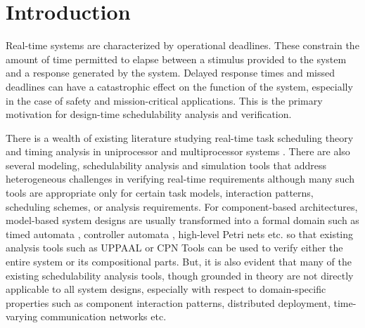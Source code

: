 \section{Introduction}

Real-time systems are characterized by operational deadlines. These constrain the amount of time permitted to elapse between a stimulus provided to the system and a response generated by the system. Delayed response times and missed deadlines can have a catastrophic effect on the function of the system, especially in the case of safety and mission-critical applications. This is the primary motivation for design-time schedulability analysis and verification. 

There is a wealth of existing literature studying real-time task scheduling theory and timing analysis in uniprocessor and multiprocessor systems \cite{Audsley1995, Sha2004}. There are also several modeling, schedulability analysis and simulation tools \cite{MAST1, Cheddar, TIMES, PTIDES} that address heterogeneous challenges in verifying real-time requirements although many such tools are appropriate only for certain task models, interaction patterns, scheduling schemes, or analysis requirements. For component-based architectures, model-based system designs are usually transformed into a formal domain such as timed automata \cite{Alur1994, Macariu2010}, controller automata \cite{Zhang2012}, high-level Petri nets \cite{masri2009} etc. so that existing analysis tools such as UPPAAL \cite{UPPAAL} or CPN Tools \cite{CPNTools} can be used to verify either the entire system or its compositional parts. But, it is also evident that many of the existing schedulability analysis tools, though grounded in theory are not directly applicable to all system designs, especially with respect to domain-specific properties such as component interaction patterns, distributed deployment, time-varying communication networks etc. 


